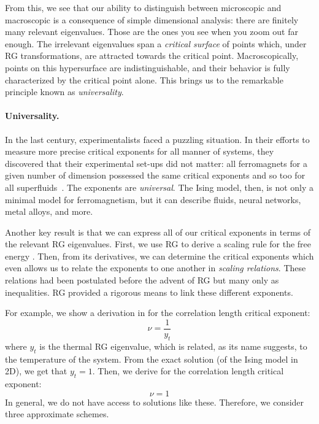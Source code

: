 From this, we see that our ability to distinguish between microscopic
and macroscopic is a consequence of simple dimensional analysis: there
are finitely many relevant eigenvalues. Those are the ones you see
when you zoom out far enough. The irrelevant eigenvalues span a
\textit{critical surface} of points which, under RG transformations,
are attracted towards the critical point. Macroscopically, points on
this hypersurface are indistinguishable, and their behavior is fully
characterized by the critical point alone. This brings us to the
remarkable principle known as \textit{universality}.

\paragraph{Universality.}
In the last century, experimentalists faced a puzzling situation.  In
their efforts to measure more precise critical exponents for all
manner of systems, they discovered that their experimental set-ups did
not matter: all ferromagnets for a given number of dimension possessed
the same critical exponents and so too for all
superfluids~\cite{domb}. The exponents are \textit{universal}. The
Ising model, then, is not only a minimal model for ferromagnetism, but
it can describe fluids, neural networks, metal alloys, and more.

Another key result is that we can express all of our critical
exponents in terms of the relevant RG eigenvalues. First, we use RG to
derive a scaling rule for the free energy
. Then, from its derivatives, we can
determine the critical exponents which even allows us to relate the
exponents to one another in \textit{scaling relations}. These
relations had been postulated before the advent of RG but many only as
inequalities. RG provided a rigorous means to link these different
exponents.

For example, we show a derivation in 
for the correlation length critical exponent:%
\begin{equation}%
  \boxed{\nu=\frac{1}{y_t}}
\end{equation}%
where $y_t$ is the thermal RG eigenvalue, which is related, as its
name suggests, to the temperature of the system. From the exact
solution (of the Ising model in 2D), we get that $y_t=1$. Then, we
derive for the correlation length critical exponent:%
\begin{equation}%
  \boxed{\nu=1}
\end{equation}%
In general, we do not have access to solutions like these. Therefore,
we consider three approximate schemes.


